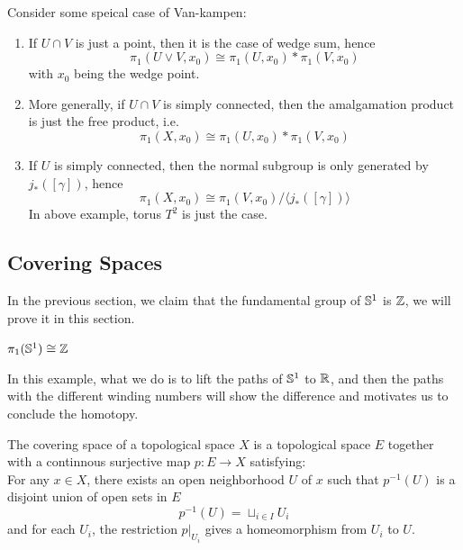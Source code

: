 \begin{remark}
    Consider some speical case of Van-kampen:
    \begin{enumerate}
        \item If \(U \cap V\) is just a point, then it is the case of wedge sum, hence
        \[\pi_1(U\vee V,x_0) \cong \pi_1(U,x_0) * \pi_1(V,x_0)\]
        with \(x_0\) being the wedge point.

        \item More generally, if \(U \cap V\) is simply connected, then the amalgamation product is just the free product, i.e.
        \[\pi_1(X,x_0) \cong \pi_1(U,x_0) * \pi_1(V,x_0)\]

        \item If \(U\) is simply connected, then the normal subgroup is only generated by \(j_*([\gamma])\), hence
        \[\pi_1(X,x_0) \cong \pi_1(V,x_0) / \langle j_*([\gamma]) \rangle\]
        In above example, torus \(T^2\) is just the case.


    \end{enumerate}
\end{remark}


\subsection{Covering Spaces}

In the previous section, we claim that the fundamental group of \(\mathbb{S}^1\) is \(\mathbb{Z}\), we will prove it in this section.

\begin{theorem}
    \(\pi_1(\mathbb{S}^1) \cong \mathbb{Z}\)
\end{theorem}

In this example, what we do is to lift the paths of \(\mathbb{S}^1\) to \(\mathbb{R}\), and then the paths with the different winding numbers will show the difference and motivates us to conclude the homotopy.

\begin{definition}
    The covering space of a topological space \(X\) is a topological space \(E\) together with a continnous surjective map \(p:E \to X\) satisfying:\\
    For any \(x \in X\), there exists an open neighborhood \(U\) of \(x\) such that \(p^{-1}(U)\) is a disjoint union of open sets in \(E\)
    \[p^{-1}(U) = \sqcup_{i \in I}U_i\]
    and for each \(U_i\), the restriction \(p|_{U_i}\) gives a homeomorphism from \(U_i\) to \(U\).
\end{definition}

